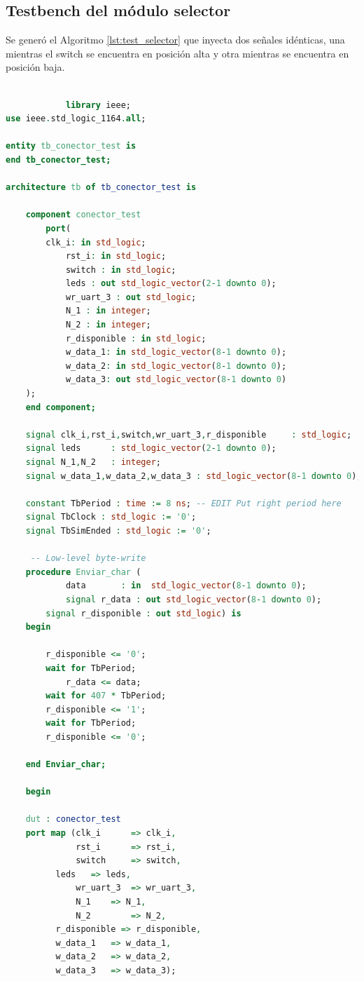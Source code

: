 	\subsection{Testbench del módulo selector}
			
		Se generó el Algoritmo \ref{lst:test_selector} que inyecta dos señales idénticas, una mientras el switch se encuentra en posición alta y otra mientras se encuentra en posición baja.		
			
		\begin{lstlisting}[language = vhdl,caption=Testbench del módulo selector,label={lst:test_selector}] 
				
			library ieee;
use ieee.std_logic_1164.all;

entity tb_conector_test is
end tb_conector_test;

architecture tb of tb_conector_test is

    component conector_test
        port(
		clk_i: in std_logic;
        	rst_i: in std_logic;
        	switch : in std_logic;
        	leds : out std_logic_vector(2-1 downto 0);
        	wr_uart_3 : out std_logic;
       	 	N_1 : in integer;
       	 	N_2 : in integer;
        	r_disponible : in std_logic;
        	w_data_1: in std_logic_vector(8-1 downto 0);
        	w_data_2: in std_logic_vector(8-1 downto 0);
        	w_data_3: out std_logic_vector(8-1 downto 0)
	);
    end component;

    signal clk_i,rst_i,switch,wr_uart_3,r_disponible     : std_logic;
    signal leds      : std_logic_vector(2-1 downto 0);
    signal N_1,N_2   : integer;
    signal w_data_1,w_data_2,w_data_3 : std_logic_vector(8-1 downto 0);

    constant TbPeriod : time := 8 ns; -- EDIT Put right period here
    signal TbClock : std_logic := '0';
    signal TbSimEnded : std_logic := '0';

	 -- Low-level byte-write
  	procedure Enviar_char (
    		data       : in  std_logic_vector(8-1 downto 0);
    		signal r_data : out std_logic_vector(8-1 downto 0);
		signal r_disponible : out std_logic) is
  	begin
		
		r_disponible <= '0';
		wait for TbPeriod;
        	r_data <= data;
		wait for 407 * TbPeriod;
		r_disponible <= '1';
		wait for TbPeriod;
		r_disponible <= '0';

  	end Enviar_char;

	begin

    dut : conector_test
    port map (clk_i      => clk_i,
              rst_i      => rst_i,
              switch     => switch,
	      leds 	 => leds,
              wr_uart_3  => wr_uart_3,
              N_1  	 => N_1,
              N_2    	 => N_2,
	      r_disponible => r_disponible,
	      w_data_1   => w_data_1,
	      w_data_2   => w_data_2,
	      w_data_3   => w_data_3);
 

\end{lstlisting}
